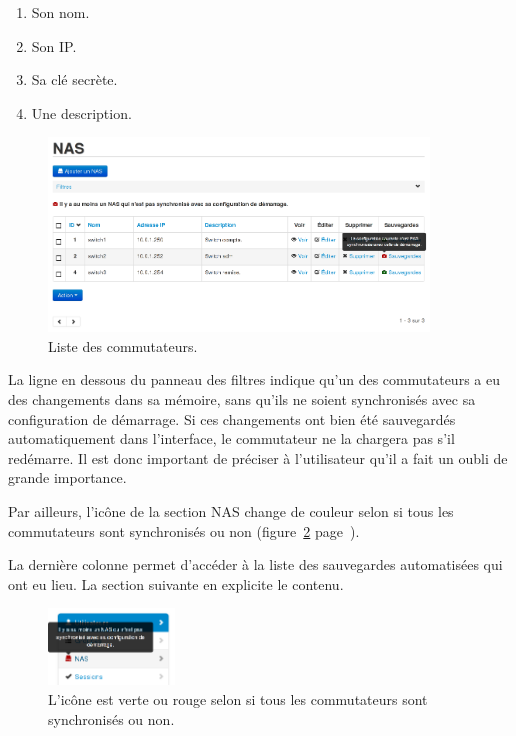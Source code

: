 \begin{enumerate}
\item Son nom.
\item Son IP.
\item Sa clé secrète.
\item Une description.
\end{enumerate}

\begin{figure}[!h]
	\begin{center}
	    \includegraphics[width=0.9\textwidth]{img/nas.png}
	\end{center}
	\caption{Liste des commutateurs.}
	\label{nas}
\end{figure}

La ligne en dessous du panneau des filtres indique qu'un des commutateurs a eu des changements dans sa mémoire, sans qu'ils ne soient synchronisés avec sa configuration de démarrage. Si ces changements ont bien été sauvegardés automatiquement dans l'interface, le commutateur ne la chargera pas s'il redémarre. Il est donc important de préciser à l'utilisateur qu'il a fait un oubli de grande importance.

Par ailleurs, l'icône de la section NAS change de couleur selon si tous les commutateurs sont synchronisés ou non (figure~\ref{menunas} page~\pageref{menunas}).

La dernière colonne permet d'accéder à la liste des sauvegardes automatisées qui ont eu lieu. La section suivante en explicite le contenu.

\begin{figure}[!h]
	\begin{center}
	    \includegraphics[width=0.3\textwidth]{img/menunas.png}
	\end{center}
	\caption{L'icône est verte ou rouge selon si tous les commutateurs sont synchronisés ou non.}
	\label{menunas}
\end{figure}


